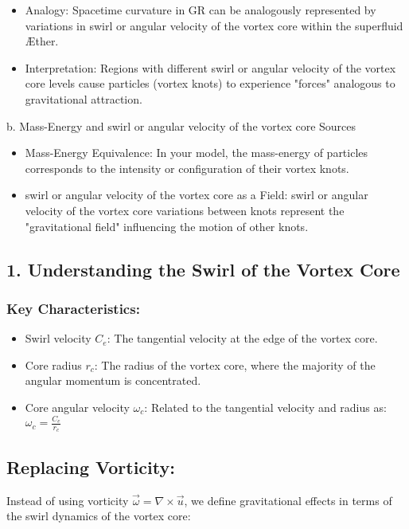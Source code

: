 {\begin{itemize}
\item Analogy: Spacetime curvature in GR can be analogously represented by variations in swirl or angular velocity of the vortex core within the superfluid Æther.

\item Interpretation: Regions with different swirl or angular velocity of the vortex core levels cause particles (vortex knots) to experience "forces" analogous to gravitational attraction.
\end{itemize}

b. Mass-Energy and swirl or angular velocity of the vortex core Sources

\begin{itemize}
\item Mass-Energy Equivalence: In your model, the mass-energy of particles corresponds to the intensity or configuration of their vortex knots.

\item swirl or angular velocity of the vortex core as a Field: swirl or angular velocity of the vortex core variations between knots represent the "gravitational field" influencing the motion of other knots.
\end{itemize}

\subsection*{1. Understanding the Swirl of the Vortex Core}
\subsubsection*{Key Characteristics:}
\begin{itemize}
\item Swirl velocity \(C_e\): The tangential velocity at the edge of the vortex core.

\item Core radius \(r_c\): The radius of the vortex core, where the majority of the angular momentum is concentrated.

\item Core angular velocity \(\omega_c\): Related to the tangential velocity and radius as: \(\omega_c = \frac{C_e}{r_c}\)
\end{itemize}

\subsection*{Replacing Vorticity:}
Instead of using vorticity \(\vec{\omega} = \nabla \times \vec{u}\), we define gravitational effects in terms of the swirl dynamics of the vortex core:

}
